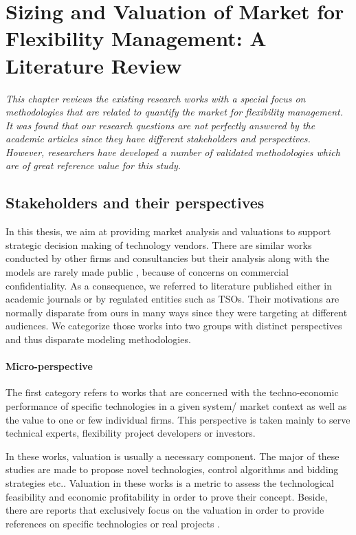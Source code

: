 \chapter{Sizing and Valuation of Market for Flexibility Management: A Literature Review}
\label{ch:LitRev}
\textit{This chapter reviews the existing research works with a special focus on methodologies that are related to quantify the market for flexibility management. It was found that our research questions are not perfectly answered by the academic articles since they have different stakeholders and perspectives. However, researchers have developed a number of validated methodologies which are of great reference value for this study.}

\section{Stakeholders and their perspectives}

In this thesis, we aim at providing market analysis and valuations to support strategic decision making of technology vendors. There are similar works conducted by other firms and consultancies but their analysis along with the models are rarely made public \cite{Zucker2013}, because of concerns on commercial confidentiality. As a consequence, we referred to literature published either in academic journals or by regulated entities such as TSOs. Their motivations are normally disparate from ours in many ways since they were targeting at different audiences. We categorize those works into two groups with distinct perspectives and thus disparate modeling methodologies.

\subsubsection{Micro-perspective}

The first category refers to works that are concerned with the techno-economic performance of specific technologies in a given system/ market context as well as the value to one or few individual firms. This perspective is taken mainly to serve technical experts, flexibility project developers or investors. 

In these works, valuation is usually a necessary component. The major of these studies are made to propose novel technologies, control algorithms and bidding strategies etc.. Valuation in these works is a metric to assess the technological feasibility and economic profitability in order to prove their concept. Beside, there are reports that exclusively focus on the valuation in order to provide references on specific technologies or real projects \cite{Mokrian2006,Walawalkar2007,Sioshansi2009,Byrne2012,Berrada2016,Salles2017}.

